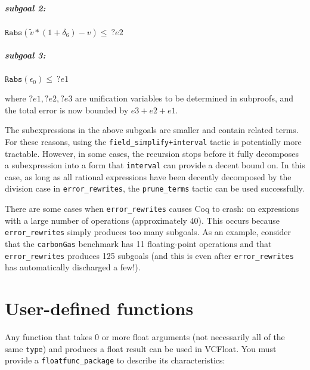 \documentclass[article]{memoir}
\begin{document}
\paragraph{subgoal 2:}
$\texttt{Rabs}(\tilde{v} * (1 + \delta_6) - v)  \le \ ?e2$

\paragraph{subgoal 3:}
$\texttt{Rabs}(\epsilon_0) \le \ ?e1$

\noindent where $?e1,?e2,?e3$ are unification variables
to be determined in subproofs, and
the total error is now bounded by $e3 + e2 + e1$. 

The subexpressions in the above subgoals are smaller 
and 
contain related terms. For these reasons, using the 
\lstinline{field_simplify+interval} tactic is potentially more 
tractable. However, in 
some cases, the recursion stops before it fully decomposes a 
subexpression into a form that \lstinline{interval} can provide 
a decent bound on. In this case, as long as all rational 
expressions have been decently decomposed by the division case 
in \lstinline{error_rewrites}, the \lstinline{prune_terms} tactic can 
be used successfully. 

There are some cases when \lstinline{error_rewrites} causes Coq 
to crash: on expressions with a large number of operations 
(approximately 40). This occurs because 
\lstinline{error_rewrites} simply produces too many subgoals. 
As an example, consider that the 
\lstinline{carbonGas} benchmark has 11 floating-point 
operations and that \lstinline{error_rewrites} produces 125 
subgoals (and this is even after \lstinline{error_rewrites} has 
automatically discharged a few!). 

\newpage
\chapter{User-defined functions}
\label{userdefined}

Any function that takes 0 or more float arguments (not necessarily
all of the same \lstinline{type}) and produces a float result can be used
in VCFloat.  You must provide a \lstinline{floatfunc_package} to describe
its characteristics:
\end{document}
